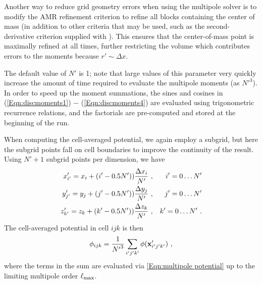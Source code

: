 Another way to reduce grid geometry errors when using the multipole
solver is to modify the AMR refinement criterion to refine all blocks
containing the center of mass (in addition to other criteria that may
be used, such as the second-derivative criterion supplied with \Paramesh).
This ensures that the center-of-mass point is maximally refined at all
times, further restricting the volume which contributes errors to the
moments because $r' \sim \Delta x$.

The default value of $N'$ is 1; note that large values of this
parameter very quickly increase the amount of time required to evaluate
the multipole moments (as ${N'}^3$). In order to speed up the moment
summations, the sines and cosines in
(\eqref{Eqn:discmoments1}) $-$ (\ref{Eqn:discmoments4}) are evaluated using
trigonometric recurrence relations, and the factorials are pre-computed
and stored at the beginning of the run.

When computing the cell-averaged potential, we again employ a subgrid, but
here the subgrid points fall on cell boundaries to improve the continuity
of the result.  Using $N'+1$ subgrid points per dimension, we have
\begin{eqnarray}
x'_{i'} = x_i + (i'-0.5N')){\Delta x_i\over {N'}}\ ,&&
  i' = 0\ldots {N'} \\
y'_{j'} = y_j + (j'-0.5N')){\Delta y_j\over {N'}}\ ,&&
  j' = 0\ldots {N'} \\
z'_{k'} = z_k + (k'-0.5N')){\Delta z_k\over {N'}}\ ,&&
  k' = 0\ldots {N'} \ .
\end{eqnarray}
The cell-averaged potential in cell $ijk$ is then
\begin{equation}
\phi_{ijk} = {1\over {N'}^3} \sum_{i'j'k'} \phi({\bf x}'_{i'j'k'})\ ,
\end{equation}
where the terms in the sum are evaluated via 
\eqref{Eqn:multipole potential} up to the limiting multipole order
$\ell_{\rm max}$.

